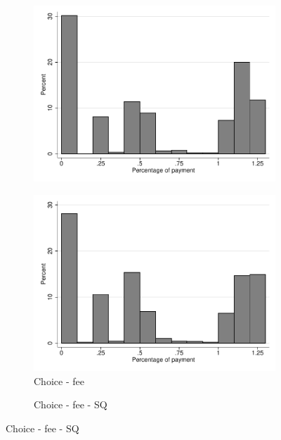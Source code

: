 \documentclass[11pt]{article}
\begin{document}
\begin{figure}[H]
\begin{center}
\begin{subfigure}{.31\textwidth}
        \centering
        \includegraphics[width=\textwidth]{Figuras/hist_porc_pay_pro_3.pdf}
    \end{subfigure}  
     \begin{subfigure}{.31\textwidth}
    \caption{Choice - fee}
        \centering
        \includegraphics[width=\textwidth]{Figuras/hist_porc_pay_pro_4.pdf}
    \end{subfigure}  
     \begin{subfigure}{.31\textwidth}
    \caption{Choice - fee - SQ}
        \centering

\end{subfigure}
\end{center}
\end{figure}
\end{document}
